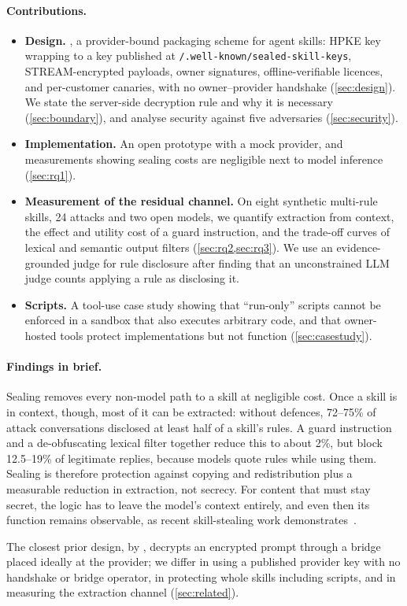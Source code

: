 \paragraph{Contributions.}
\begin{itemize}
  \item \textbf{Design.} \sys{}, a provider-bound packaging scheme for agent skills: HPKE key
  wrapping to a key published at \texttt{/.well-known/sealed-skill-keys}, STREAM-encrypted
  payloads, owner signatures, offline-verifiable licences, and per-customer canaries, with no
  owner--provider handshake (\cref{sec:design}). We state the server-side decryption rule and why
  it is necessary (\cref{sec:boundary}), and analyse security against five adversaries
  (\cref{sec:security}).
  \item \textbf{Implementation.} An open prototype with a mock provider, and measurements showing
  sealing costs are negligible next to model inference (\cref{sec:rq1}).
  \item \textbf{Measurement of the residual channel.} On eight synthetic multi-rule skills, 24
  attacks and two open models, we quantify extraction from context, the effect and utility cost of
  a guard instruction, and the trade-off curves of lexical and semantic output filters
  (\cref{sec:rq2,sec:rq3}). We use an evidence-grounded judge for rule disclosure after finding that
  an unconstrained LLM judge counts applying a rule as disclosing it.
  \item \textbf{Scripts.} A tool-use case study showing that ``run-only'' scripts cannot be
  enforced in a sandbox that also executes arbitrary code, and that owner-hosted tools protect
  implementations but not function (\cref{sec:casestudy}).
\end{itemize}

\paragraph{Findings in brief.}
Sealing removes every non-model path to a skill at negligible cost. Once a skill is in context,
though, most of it can be extracted: without defences, 72--75\% of attack conversations disclosed
at least half of a skill's rules. A guard instruction and a de-obfuscating lexical filter together
reduce this to about 2\%, but block 12.5--19\% of legitimate replies, because models quote rules
while using them. Sealing is therefore protection against copying and redistribution plus a
measurable reduction in extraction, not secrecy. For content that must stay secret, the logic has
to leave the model's context entirely, and even then its function remains observable, as recent
skill-stealing work demonstrates~\citep{tsai2026daydreaming,hua2026behavioral}.

The closest prior design, by \citet{vanwyk2023protect}, decrypts an encrypted prompt through a
bridge placed ideally at the provider; we differ in using a published provider key with no
handshake or bridge operator, in protecting whole skills including scripts, and in measuring the
extraction channel (\cref{sec:related}).
